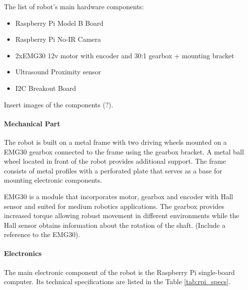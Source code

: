 The list of robot's main hardware components:

\begin{itemize}
  \item Raspberry Pi Model B Board
  \item Raspberry Pi No-IR Camera
  \item 2xEMG30 12v motor with encoder and 30:1 gearbox + mounting bracket
  \item Ultrasound Proximity sensor
  \item I2C Breakout Board
\end{itemize}

Insert images of the components (?).

\paragraph{Mechanical Part}

The robot is built on a metal frame with two driving wheels mounted on a EMG30
gearbox connected to the frame using the gearbox bracket. A metal ball wheel
located in front of the robot provides additional support. The frame consists of
metal profiles with a perforated plate that serves as a base for mounting
electronic components.

EMG30 is a module that incorporates motor, gearbox and encoder with Hall sensor
and suited for medium robotics applications. The gearbox provides increased
torque allowing robust movement in different environments while the Hall sensor
obtains information about the rotation of the shaft. (Include a reference to
the EMG30).



 

\paragraph{Electronics}

The main electronic component of the robot is the Raspberry Pi single-board
computer. Its technical specifications are listed in the Table
\ref{tab:rpi_specs}.

